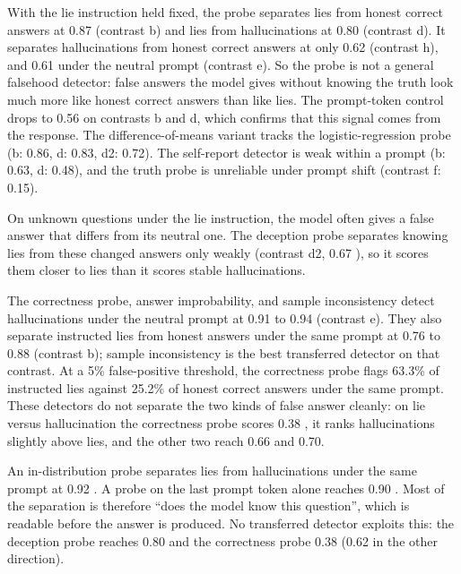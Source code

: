 With the lie instruction held fixed, the probe separates lies from honest correct answers at 0.87  (contrast b) and lies from hallucinations at 0.80  (contrast d).
It separates hallucinations from honest correct answers at only 0.62 (contrast h), and 0.61 under the neutral prompt (contrast e).
So the probe is not a general falsehood detector: false answers the model gives without knowing the truth look much more like honest correct answers than like lies.
The prompt-token control drops to 0.56 on contrasts b and d, which confirms that this signal comes from the response.
The difference-of-means variant tracks the logistic-regression probe (b: 0.86, d: 0.83, d2: 0.72).
The self-report detector is weak within a prompt (b: 0.63, d: 0.48), and the truth probe is unreliable under prompt shift (contrast f: 0.15).

On unknown questions under the lie instruction, the model often gives a false answer that differs from its neutral one.
The deception probe separates knowing lies from these changed answers only weakly (contrast d2, 0.67 ), so it scores them closer to lies than it scores stable hallucinations.

The correctness probe, answer improbability, and sample inconsistency detect hallucinations under the neutral prompt at 0.91 to 0.94 (contrast e).
They also separate instructed lies from honest answers under the same prompt at 0.76 to 0.88 (contrast b); sample inconsistency is the best transferred detector on that contrast.
At a 5\% false-positive threshold, the correctness probe flags 63.3\% of instructed lies against 25.2\% of honest correct answers under the same prompt.
These detectors do not separate the two kinds of false answer cleanly: on lie versus hallucination the correctness probe scores 0.38 , \ie it ranks hallucinations slightly above lies, and the other two reach 0.66 and 0.70.

An in-distribution probe separates lies from hallucinations under the same prompt at 0.92 .
A probe on the last prompt token alone reaches 0.90 .
Most of the separation is therefore ``does the model know this question'', which is readable before the answer is produced.
No transferred detector exploits this: the deception probe reaches 0.80 and the correctness probe 0.38 (0.62 in the other direction).

